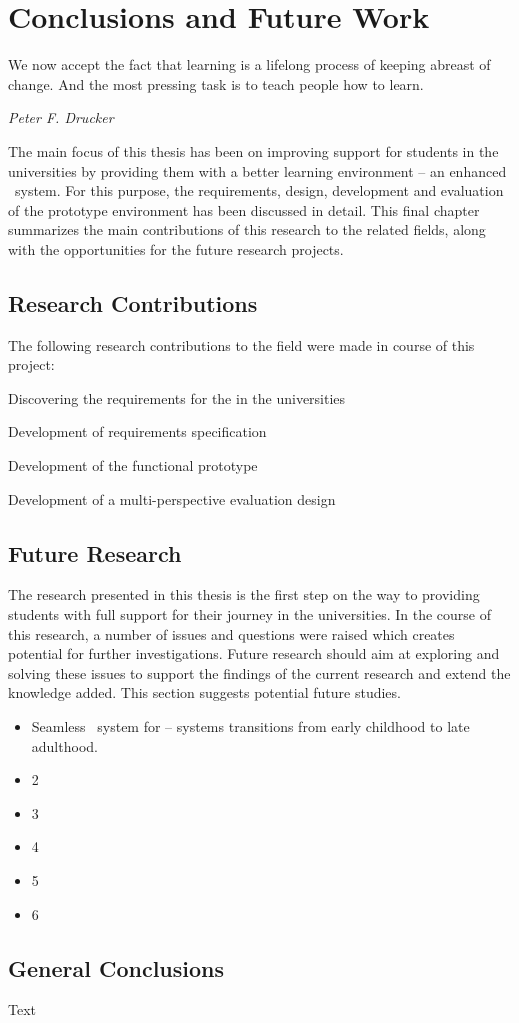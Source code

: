 \chapter{Conclusions and Future Work\label{cha:conclusion}}
\epigraph{We now accept the fact that learning is a lifelong process of keeping
abreast of change. And the most pressing task is to teach people how to
learn.}{\textit{Peter F. Drucker}}
The main focus of this thesis has been on improving \LLLs support for students
in the universities by providing them with a better learning environment -- an
enhanced \ep~system. For this purpose, the requirements, design, development and
evaluation of the prototype environment has been discussed in detail. This final
chapter summarizes the main contributions of this research to the related
fields, along with the opportunities for the future research projects.

\section{Research Contributions}

The following research contributions to the field were made in course of this
project:

Discovering the requirements for the \LLLs in the universities

Development of requirements specification

Development of the functional prototype

Development of a multi-perspective evaluation design

\section{Future Research}
The research presented in this thesis is the first step on the way to providing
students with full support for their \LLLs journey in the universities. In the
course of this research, a number of issues and questions were raised which
creates potential for further investigations. Future research should aim at
exploring and solving these issues to support the findings of the current
research and extend the knowledge added. This section suggests potential future
studies.

\begin{itemize}
  \item Seamless \ep~system for \LLLs -- systems transitions from early
  childhood to late adulthood.
  \item 2
  \item 3
  \item 4
  \item 5
  \item 6
\end{itemize}

\section{General Conclusions}

Text